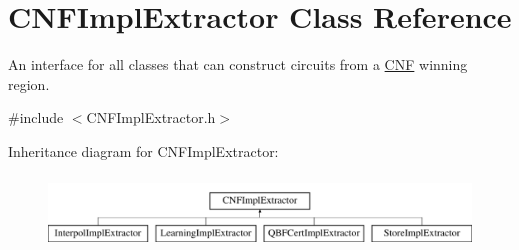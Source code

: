 \hypertarget{classCNFImplExtractor}{\section{C\-N\-F\-Impl\-Extractor Class Reference}
\label{classCNFImplExtractor}
}


An interface for all classes that can construct circuits from a \hyperlink{classCNF}{C\-N\-F} winning region.  




{\ttfamily \#include $<$C\-N\-F\-Impl\-Extractor.\-h$>$}

Inheritance diagram for C\-N\-F\-Impl\-Extractor\-:\begin{figure}[H]
\begin{center}
\leavevmode
\includegraphics[height=1.958042cm]{classCNFImplExtractor}
\end{center}
\end{figure}
